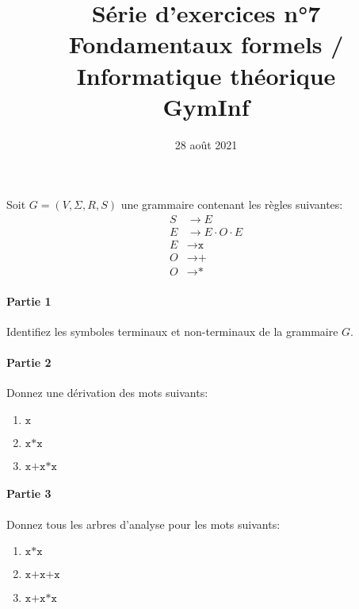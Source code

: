 \documentclass[12pt,french,a4paper]{article}
\begin{document}
\title{\vspace{-2cm}Série d'exercices n°7\\\large{Fondamentaux formels / Informatique théorique\\GymInf}}
\date{\vspace{-1cm}28 août 2021}

\maketitle

\begin{question}

Soit $G = (V, \Sigma, R, S)$ une grammaire contenant les règles suivantes:
\begin{align*}
S &\to E\\
E &\to E \cdot O \cdot E\\
E &\to \texttt{x}\\
O &\to \texttt{+}\\
O &\to \texttt{*}
\end{align*}

\paragraph{Partie 1}

Identifiez les symboles terminaux et non-terminaux de la grammaire $G$.

\paragraph{Partie 2}

Donnez une dérivation des mots suivants:
\begin{enumerate}
\item $\texttt{x}$
\item $\texttt{x*x}$
\item $\texttt{x+x*x}$
\end{enumerate}

\paragraph{Partie 3}

Donnez tous les arbres d'analyse pour les mots suivants:
\begin{enumerate}
\item $\texttt{x*x}$
\item $\texttt{x+x+x}$
\item $\texttt{x+x*x}$
\end{enumerate}


\end{question}
\end{document}
